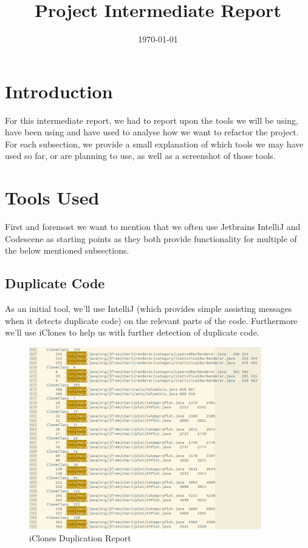 \documentclass{article}
\title{\textmd{\textbf{Project Intermediate Report}}\\\normalsize\vspace{0.1in}\Large{\projectnaam}}
\author{\student}\date{\today}
\begin{document}
\maketitle
\newpage

\section{Introduction}

For this intermediate report, we had to report upon the tools we will be using, have been using and have used to analyse how we want to refactor the project.\\

For each subsection, we provide a small explanation of which tools we may have used so far, or are planning to use, as well as a screenshot of those tools. 

\section{Tools Used}

First and foremost we want to mention that we often use Jetbrains IntelliJ and Codescene as starting points as they both provide functionality for multiple of the below mentioned subsections.

\subsection{Duplicate Code}

As an initial tool, we'll use IntelliJ (which provides simple assisting messages when it detects duplicate code) on the relevant parts of the code. Furthermore we'll use iClones to help us with further detection of duplicate code.

\begin{figure}[H]
\centering
	\includegraphics[width=0.9\textwidth]{iclones_dup.png}
	\caption{iClones Duplication Report}
\end{figure}
\end{document}
